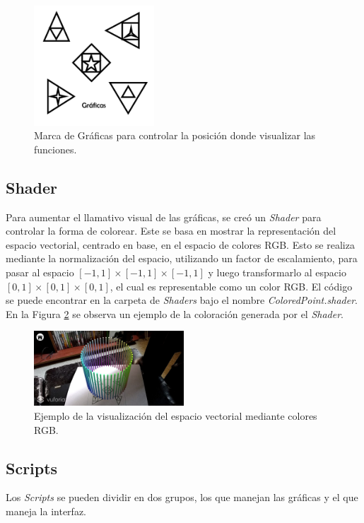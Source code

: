 \begin{figure}[hbt!]
\centering
\includegraphics[width=0.4\textwidth]{figuras/graficas/centro.png}
\caption{\label{fig:graf_centro}Marca de Gráficas para controlar la posición donde visualizar las funciones.}
\end{figure}
\FloatBarrier

\subsection{Shader}
Para aumentar el llamativo visual de las gráficas, se creó un \textit{Shader} para controlar la forma de colorear. Este se basa en mostrar la representación del espacio vectorial, centrado en base, en el espacio de colores RGB. Esto se realiza mediante la normalización del espacio, utilizando un factor de escalamiento, para pasar al espacio $[-1,1]\times[-1,1]\times[-1,1]$ y luego transformarlo al espacio $[0,1]\times[0,1]\times[0,1]$, el cual es representable como un color RGB. El código se puede encontrar en la carpeta de \textit{Shaders} bajo el nombre \textit{ColoredPoint.shader}. En la Figura \ref{fig:graf_shader} se observa un ejemplo de la coloración generada por el \textit{Shader}.

\begin{figure}[hbt!]
\centering
\includegraphics[width=0.5\textwidth]{figuras/graficas/shader.png}
\caption{\label{fig:graf_shader}Ejemplo de la visualización del espacio vectorial mediante colores RGB.}
\end{figure}
\FloatBarrier

\subsection{Scripts}
Los \textit{Scripts} se pueden dividir en dos grupos, los que manejan las gráficas y el que maneja la interfaz.

